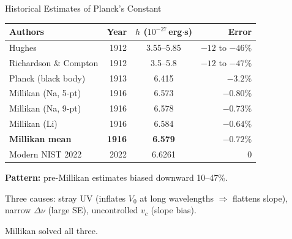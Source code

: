 \documentclass[aspectratio=169,12pt]{beamer}
\begin{document}
\begin{frame}[shrink=5]{Historical Estimates of Planck's Constant}

\begin{center}
\begin{tabular}{p{4.4cm}rcr}
\toprule
Authors & Year & $h$ ($10^{-27}$\,erg$\cdot$s) & Error \\
\midrule
Hughes              & 1912 & 3.55--5.85        & $-12$ to $-46\%$ \\
Richardson \& Compton & 1912 & 3.5--5.8        & $-12$ to $-47\%$ \\
Planck (black body) & 1913 & 6.415             & $-3.2\%$         \\
\midrule
Millikan (Na, 5-pt) & 1916 & 6.573             & $-0.80\%$        \\
Millikan (Na, 9-pt) & 1916 & 6.578             & $-0.73\%$        \\
Millikan (Li)       & 1916 & 6.584             & $-0.64\%$        \\
\textbf{Millikan mean} & \textbf{1916} & \textbf{6.579} & $\mathbf{-0.72\%}$ \\
\midrule
Modern NIST 2022    & 2022 & 6.6261            & 0                \\
\bottomrule
\end{tabular}
\end{center}

\bigskip
\textbf{Pattern:} pre-Millikan estimates biased downward 10--47\%.

\smallskip
Three causes: stray UV (inflates $V_0$ at long wavelengths $\Rightarrow$ flattens slope),
narrow $\Delta\nu$ (large SE), uncontrolled $v_c$ (slope bias).

\smallskip
Millikan solved all three.

\end{frame}
\end{document}
